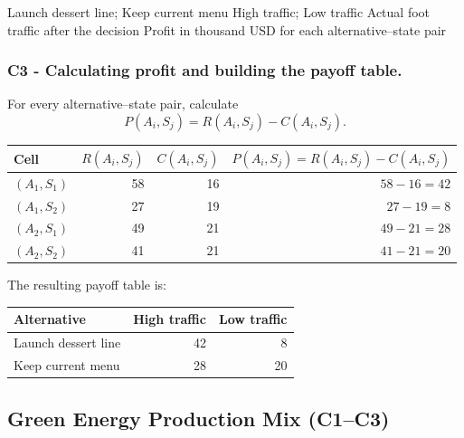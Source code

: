 \DecisionElementsTable
{Launch dessert line; Keep current menu}
{High traffic; Low traffic}
{Actual foot traffic after the decision}
{Profit in thousand USD for each alternative--state pair}


\subsubsection*{C3 - Calculating profit and building the payoff table.}
\label{subsec:problem3-local-cafe-investment-c3}

For every alternative--state pair, calculate
\[
P(A_i,S_j)=R(A_i,S_j)-C(A_i,S_j).
\]

\begin{center}
	\small
	\begin{tabular}{lrrr}
		\toprule
		Cell
		& \(R(A_i,S_j)\)
		& \(C(A_i,S_j)\)
		& \(P(A_i,S_j)=R(A_i,S_j)-C(A_i,S_j)\) \\
		\midrule
		\((A_1,S_1)\) & 58 & 16 & \(58-16=42\) \\
		\((A_1,S_2)\) & 27 & 19 & \(27-19=8\) \\
		\((A_2,S_1)\) & 49 & 21 & \(49-21=28\) \\
		\((A_2,S_2)\) & 41 & 21 & \(41-21=20\) \\
		\bottomrule
	\end{tabular}
\end{center}

The resulting payoff table is:

\begin{center}
	\begin{tabular}{lrr}
		\toprule
		Alternative & High traffic & Low traffic \\
		\midrule
		Launch dessert line & 42 & 8 \\
		Keep current menu & 28 & 20 \\
		\bottomrule
	\end{tabular}
\end{center}


\subsection{Green Energy Production Mix (C1--C3)}
\label{sec:problem4-green-energy-production-mix-c1-c3}

